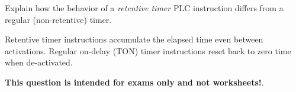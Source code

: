 

Explain how the behavior of a {\it retentive timer} PLC instruction differs from a regular (non-retentive) timer.







Retentive timer instructions accumulate the elapsed time even between activations.  Regular on-delay (TON) timer instructions reset back to zero time when de-activated.







{\bf This question is intended for exams only and not worksheets!}.


